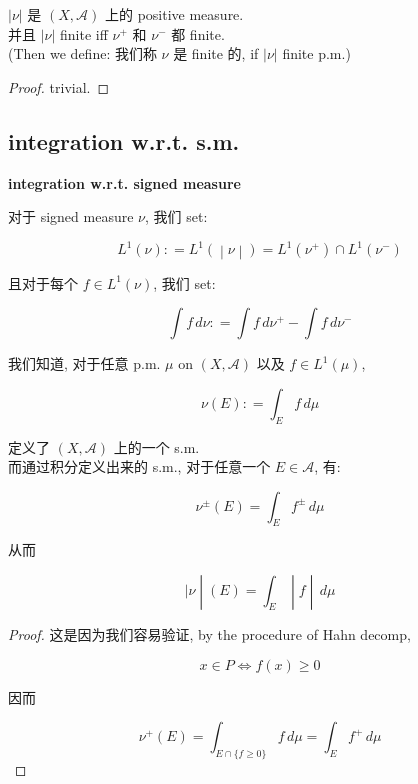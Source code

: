 \documentclass{qlnotes-export}
\begin{document}
\begin{lemma}

\(|\nu|\) 是 \((X,\mathcal{A})\) 上的 positive measure.\\
并且 \(|\nu|\) finite iff \(\nu^{+}\) 和 \(\nu^{-}\) 都 finite.\\
(Then we define: 我们称 \(\nu\) 是 finite 的, if \(|\nu|\) finite p.m.)

\end{lemma}

\begin{proof}

trivial.

\end{proof}

\subsection{integration w.r.t. s.m.}\label{integration-w.r.t.-s.m.}

\begin{definition}{\protect{}\label{kn-integration-w-r-t-signed-measure}{\textbf{integration
w.r.t. signed measure}}}

对于 signed measure \(\nu\), 我们 set:

\[\left. L^{1}(\nu): = L^{1}( \middle| \nu \middle| ) = L^{1}(\nu^{+}) \cap L^{1}(\nu^{-}) \right.\]

且对于每个 \(f \in L^{1}(\nu)\), 我们 set:

\[\int f\, d\nu: = \int f\, d\nu^{+} - \int f\, d\nu^{-}\]

\end{definition}

\begin{proposition}

我们知道, 对于任意 p.m. \(\mu\) on \((X,\mathcal{A})\) 以及 \(f \in L^{1}(\mu)\),

\[\nu(E): = \int_{E}f\, d\mu\]

定义了 \((X,\mathcal{A})\) 上的一个 s.m.\\
而通过积分定义出来的 s.m., 对于任意一个 \(E \in \mathcal{A}\), 有:

\[\nu^{\pm}(E) = \int_{E}f^{\pm}\, d\mu\]

从而

\[\left. |\nu \middle| (E) = \int_{E} \middle| f \middle| \, d\mu \right.\]

\end{proposition}

\begin{proof}

这是因为我们容易验证, by the procedure of Hahn decomp,

\[x \in P\Leftrightarrow f(x) \geq 0\]

因而

\[\nu^{+}(E) = \int_{E \cap {\{{f \geq 0}\}}}f\, d\mu = \int_{E}f^{+}\, d\mu\]

\end{proof}
\end{document}
